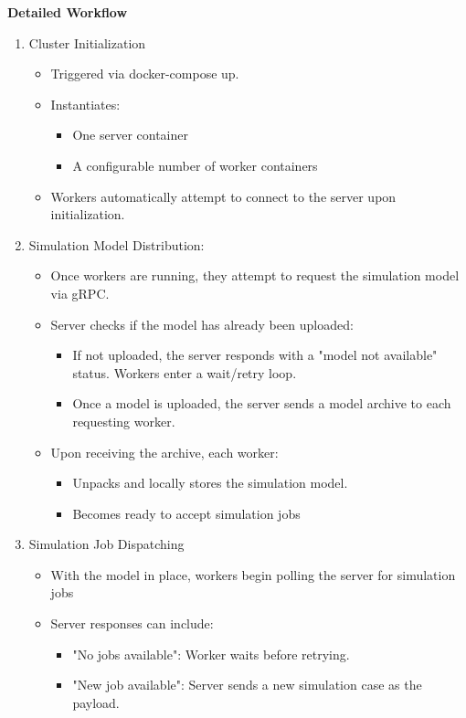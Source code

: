 \textbf{Detailed Workflow}
\begin{enumerate}
	\item Cluster Initialization
	\begin{itemize}
		\item Triggered via docker-compose up.
		\item Instantiates:
		\begin{itemize}
			\item One server container
			\item A configurable number of worker containers
		\end{itemize}
		\item Workers automatically attempt to connect to the server upon initialization.
	\end{itemize}
	\item Simulation Model Distribution:
	\begin{itemize}
		\item Once workers are running, they attempt to request the simulation model via gRPC.
		\item Server checks if the model has already been uploaded:
		\begin{itemize}
			\item If not uploaded, the server responds with a "model not available" status. Workers enter a wait/retry loop.
			\item Once a model is uploaded, the server sends a model archive to each requesting worker.
		\end{itemize}
		\item Upon receiving the archive, each worker:
		\begin{itemize}
			\item Unpacks and locally stores the simulation model.
			\item Becomes ready to accept simulation jobs
		\end{itemize}
	\end{itemize}
	\item Simulation Job Dispatching
	\begin{itemize}
		\item With the model in place, workers begin polling the server for simulation jobs
		\item Server responses can include:
		\begin{itemize}
			\item "No jobs available": Worker waits before retrying.
			\item "New job available": Server sends a new simulation case as the payload.

\end{itemize}
\end{itemize}
\end{enumerate}
